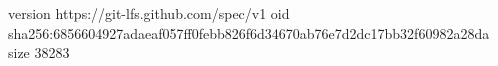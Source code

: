 version https://git-lfs.github.com/spec/v1
oid sha256:6856604927adaeaf057ff0febb826f6d34670ab76e7d2dc17bb32f60982a28da
size 38283
